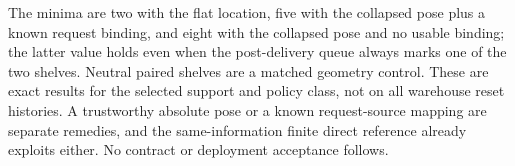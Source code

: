 \documentclass[11pt]{article}
\begin{document}
The minima are two with the flat location, five with the
collapsed pose plus a known request binding, and eight with
the collapsed pose and no usable binding; the latter value
holds even when the post-delivery queue always marks one of the
two shelves. Neutral paired shelves are a matched geometry control.
These are exact results for the selected support and policy class,
not on all warehouse reset histories. A trustworthy absolute pose
or a known request-source mapping are separate remedies, and the
same-information finite direct reference already exploits either.
No contract or deployment acceptance follows.
\end{document}
